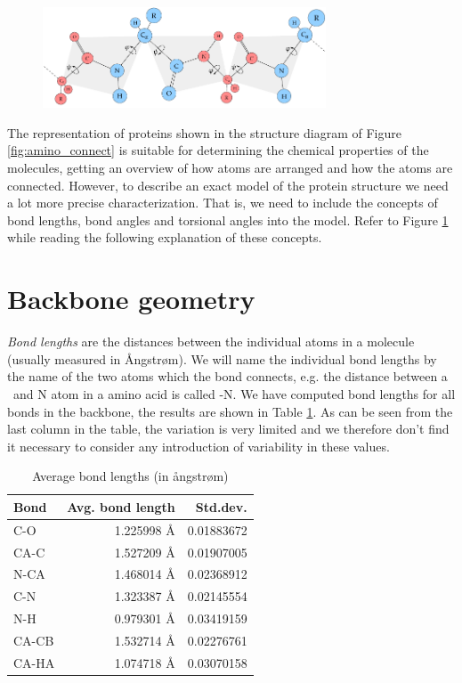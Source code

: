 \begin{figure}
  \centering
  \includegraphics[width=0.75\textwidth]{figures/protein-torsion-angles}
  \caption{}
  \label{fig:protein-torsion-angles}
\end{figure}

The representation of proteins shown in the structure diagram of
Figure \ref{fig:amino_connect} is suitable for determining the
chemical properties of the molecules, getting an overview of how atoms
are arranged and how the atoms are connected. However, to describe an
exact model of the protein structure we need a lot more precise
characterization. That is, we need to include the concepts of bond
lengths, bond angles and torsional angles into the model. Refer to
Figure \ref{fig:protein-torsion-angles} while reading the following
explanation of these concepts.

\section{Backbone geometry}
\textit{Bond lengths} are the distances between the individual atoms
in a molecule (usually measured in Ångstrøm). We will name the
individual bond lengths by the name of the two atoms which the bond
connects, e.g. the distance between a \Ca\ and N atom in a amino acid
is called \Ca -N. We have computed bond lengths for all bonds in the
backbone, the results are shown in Table
\ref{tab:average_bond_lengths}. As can be seen from the last column in
the table, the variation is very limited and we therefore don't find
it necessary to consider any introduction of variability in these
values.

\begin{table}
  \centering
  \begin{tabular}{lrr}
    \toprule
    Bond & Avg. bond length & Std.dev. \\ \midrule
    C-O   & 1.225998 Å & 0.01883672\\
    CA-C  & 1.527209 Å & 0.01907005\\
    N-CA  & 1.468014 Å & 0.02368912\\
    C-N   & 1.323387 Å & 0.02145554\\
    N-H   & 0.979301 Å & 0.03419159\\
    CA-CB & 1.532714 Å & 0.02276761\\
    CA-HA & 1.074718 Å & 0.03070158\\ \bottomrule
  \end{tabular}
  \vspace{1mm}
  \caption{Average bond lengths (in ångstrøm)}
  \label{tab:average_bond_lengths}
\end{table}

